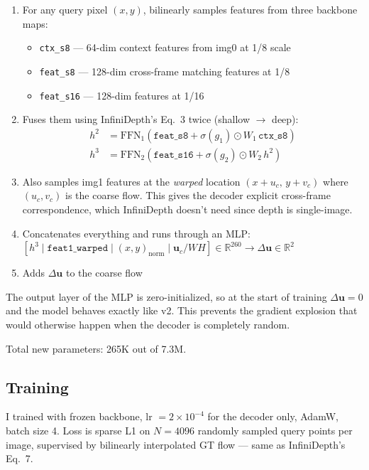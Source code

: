 \documentclass[11pt,a4paper]{article}
\begin{document}
\begin{enumerate}[leftmargin=*,itemsep=2pt]
  \item For any query pixel $(x,y)$, bilinearly samples features from three backbone maps:
    \begin{itemize}[itemsep=0pt]
      \item \texttt{ctx\_s8} --- 64-dim context features from img0 at 1/8 scale
      \item \texttt{feat\_s8} --- 128-dim cross-frame matching features at 1/8
      \item \texttt{feat\_s16} --- 128-dim features at 1/16
    \end{itemize}
  \item Fuses them using InfiniDepth's Eq.~3 twice (shallow $\to$ deep):
    \begin{align*}
      h^2 &= \mathrm{FFN}_1\!\left(\texttt{feat\_s8} + \sigma(g_1) \odot W_1\,\texttt{ctx\_s8}\right) \\
      h^3 &= \mathrm{FFN}_2\!\left(\texttt{feat\_s16} + \sigma(g_2) \odot W_2\,h^2\right)
    \end{align*}
  \item Also samples img1 features at the \emph{warped} location $(x + u_c,\, y + v_c)$ where $(u_c, v_c)$ is the coarse flow. This gives the decoder explicit cross-frame correspondence, which InfiniDepth doesn't need since depth is single-image.
  \item Concatenates everything and runs through an MLP: $[h^3 \mid \texttt{feat1\_warped} \mid (x,y)_\text{norm} \mid \mathbf{u}_c/WH] \in \mathbb{R}^{260} \to \Delta\mathbf{u} \in \mathbb{R}^2$
  \item Adds $\Delta\mathbf{u}$ to the coarse flow
\end{enumerate}

The output layer of the MLP is zero-initialized, so at the start of training $\Delta\mathbf{u} = 0$ and the model behaves exactly like v2. This prevents the gradient explosion that would otherwise happen when the decoder is completely random.

Total new parameters: 265K out of 7.3M.

\subsection{Training}

I trained with frozen backbone, lr $= 2\times10^{-4}$ for the decoder only, AdamW, batch size 4. Loss is sparse L1 on $N=4096$ randomly sampled query points per image, supervised by bilinearly interpolated GT flow --- same as InfiniDepth's Eq.~7.
\end{document}
